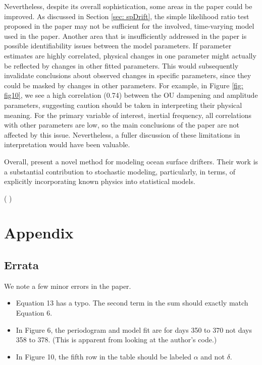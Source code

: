 \documentclass{stat572Style}
\newcommand{\vmcomment}[1]{({\color{blue}{VM's comment:}} \textbf{\color{blue}{#1}})}
\begin{document}
Nevertheless, despite its overall sophistication, some areas in the paper could be improved. 
As discussed in Section \ref{sec: spDrift}, the simple likelihood ratio test proposed in the paper may not be sufficient for the involved, time-varying model used in the paper.  
Another area that is insufficiently addressed in the paper is possible identifiability issues between the model parameters. 
 If parameter estimates are highly correlated, physical changes in one parameter might actually be reflected by changes in other fitted parameters.
  This would subsequently invalidate conclusions about observed changes in specific parameters, since they could be masked by changes in other parameters. 
 For example, in Figure \ref{fig: fig10}, we see a high correlation (0.74) between the OU dampening and amplitude parameters, suggesting caution should be taken in interpreting their physical meaning. 
 For the primary variable of interest, inertial frequency, all correlations with other parameters are low, so the main conclusions of the paper are not affected by this issue. 
Nevertheless, a fuller discussion of these limitations in interpretation would have been valuable.
\par Overall, \citet{Sykulski2016} present a novel method for modeling ocean surface drifters.
 Their work is a substantial contribution to stochastic modeling, particularly, in terms, of explicitly incorporating known physics into statistical models. 




\clearpage

\vmcomment{Remove URLs from References}




\section{Appendix}

\subsection{Errata}
We note a few minor errors in the paper.
\begin{itemize}
\item Equation 13 has a typo. The second term in the sum should exactly match Equation 6. 
\item In Figure 6, the periodogram and model fit are for days 350 to 370 not days 358 to 378. (This is apparent from looking at the author's code.)
\item In Figure 10, the fifth row in the table should be labeled $\alpha$ and not $\delta$.
\end{itemize} 
\end{document}
